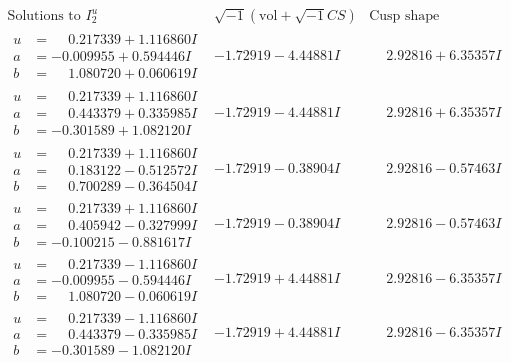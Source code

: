 \documentclass[1p]{elsarticle_modified}
\theoremstyle{definition}
\newcommand{\I}{\sqrt{-1}}
\begin{document}
$$\begin{array}{c|c|c}  
\text{Solutions to }I^u_{2}& \I (\text{vol} + \sqrt{-1}CS) & \text{Cusp shape}\\
 \hline 
\begin{aligned}
u &= \phantom{-}0.217339 + 1.116860 I \\
a &= -0.009955 + 0.594446 I \\
b &= \phantom{-}1.080720 + 0.060619 I\end{aligned}
 & -1.72919 - 4.44881 I & \phantom{-}2.92816 + 6.35357 I \\ \hline\begin{aligned}
u &= \phantom{-}0.217339 + 1.116860 I \\
a &= \phantom{-}0.443379 + 0.335985 I \\
b &= -0.301589 + 1.082120 I\end{aligned}
 & -1.72919 - 4.44881 I & \phantom{-}2.92816 + 6.35357 I \\ \hline\begin{aligned}
u &= \phantom{-}0.217339 + 1.116860 I \\
a &= \phantom{-}0.183122 - 0.512572 I \\
b &= \phantom{-}0.700289 - 0.364504 I\end{aligned}
 & -1.72919 - 0.38904 I & \phantom{-}2.92816 - 0.57463 I \\ \hline\begin{aligned}
u &= \phantom{-}0.217339 + 1.116860 I \\
a &= \phantom{-}0.405942 - 0.327999 I \\
b &= -0.100215 - 0.881617 I\end{aligned}
 & -1.72919 - 0.38904 I & \phantom{-}2.92816 - 0.57463 I \\ \hline\begin{aligned}
u &= \phantom{-}0.217339 - 1.116860 I \\
a &= -0.009955 - 0.594446 I \\
b &= \phantom{-}1.080720 - 0.060619 I\end{aligned}
 & -1.72919 + 4.44881 I & \phantom{-}2.92816 - 6.35357 I \\ \hline\begin{aligned}
u &= \phantom{-}0.217339 - 1.116860 I \\
a &= \phantom{-}0.443379 - 0.335985 I \\
b &= -0.301589 - 1.082120 I\end{aligned}
 & -1.72919 + 4.44881 I & \phantom{-}2.92816 - 6.35357 I \\ \hline\begin{aligned}

\end{aligned}
\end{array}$$
\end{document}
